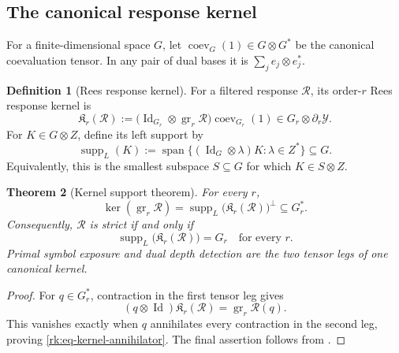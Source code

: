 \documentclass[10pt,reqno]{amsart}
\theoremstyle{plain}
\newtheorem{theorem}{Theorem}[section]
\theoremstyle{definition}
\newtheorem{definition}[theorem]{Definition}
\theoremstyle{remark}
\begin{document}
\subsection{The canonical response kernel}
\label{rk:subsec-kernel}

For a finite-dimensional space $G$, let
$\operatorname{coev}_G(1)\in G\otimes G^*$ be the canonical coevaluation
tensor.  In any pair of dual bases it is $\sum_je_j\otimes e_j^*$.

\begin{definition}[Rees response kernel]
\label{rk:def-response-kernel}
For a filtered response $\mathcal R$, its order-$r$ Rees response kernel is
\begin{equation}
 \mathfrak K_r(\mathcal R)
 :=\bigl(\operatorname{Id}_{G_r}\otimes
          \operatorname{gr}_r\mathcal R\bigr)
    \operatorname{coev}_{G_r}(1)
 \in G_r\otimes\partial_r\mathcal Y.
 \label{rk:eq-response-kernel}
\end{equation}
For $K\in G\otimes Z$, define its left support by
\begin{equation}
 \operatorname{supp}_L(K)
 :=\operatorname{span}\bigl\{
 (\operatorname{Id}_G\otimes\lambda)K:\lambda\in Z^*\bigr\}
 \subseteq G.
 \label{rk:eq-left-support}
\end{equation}
Equivalently, this is the smallest subspace $S\subseteq G$ for which
$K\in S\otimes Z$.
\end{definition}

\begin{theorem}[Kernel support theorem]
\label{rk:thm-kernel-support}
For every $r$,
\begin{equation}
 \ker(\operatorname{gr}_r\mathcal R)
 =\operatorname{supp}_L\bigl(\mathfrak K_r(\mathcal R)\bigr)^\perp
 \subseteq G_r^*.
 \label{rk:eq-kernel-annihilator}
\end{equation}
Consequently, $\mathcal R$ is strict if and only if
\begin{equation}
 \operatorname{supp}_L\bigl(\mathfrak K_r(\mathcal R)\bigr)=G_r
 \quad\text{for every }r.
 \label{rk:eq-full-support}
\end{equation}
Primal symbol exposure and dual depth detection are the two tensor legs of
one canonical kernel.
\end{theorem}

\begin{proof}
For $q\in G_r^*$, contraction in the first tensor leg gives
\[
 (q\otimes\operatorname{Id})\mathfrak K_r(\mathcal R)
 =\operatorname{gr}_r\mathcal R(q).
\]
This vanishes exactly when $q$ annihilates every contraction in the second
leg, proving \eqref{rk:eq-kernel-annihilator}.  The final assertion follows
from .
\end{proof}
\end{document}
